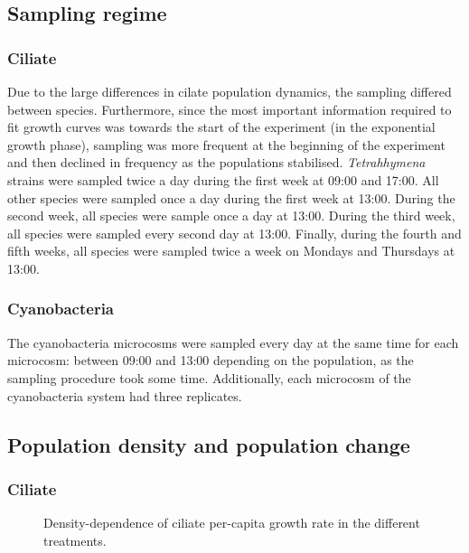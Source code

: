 \documentclass[
  letterpaper,
  DIV=11,
  numbers=noendperiod]{scrartcl}
\begin{document}
\subsection{Sampling regime}\label{sec-sampling_times}

\subsubsection{Ciliate}\label{ciliate}

Due to the large differences in cilate population dynamics, the sampling
differed between species. Furthermore, since the most important
information required to fit growth curves was towards the start of the
experiment (in the exponential growth phase), sampling was more frequent
at the beginning of the experiment and then declined in frequency as the
populations stabilised. \emph{Tetrahhymena} strains were sampled twice a
day during the first week at 09:00 and 17:00. All other species were
sampled once a day during the first week at 13:00. During the second
week, all species were sample once a day at 13:00. During the third
week, all species were sampled every second day at 13:00. Finally,
during the fourth and fifth weeks, all species were sampled twice a week
on Mondays and Thursdays at 13:00.

\subsubsection{Cyanobacteria}\label{cyanobacteria}

The cyanobacteria microcosms were sampled every day at the same time for
each microcosm: between 09:00 and 13:00 depending on the population, as
the sampling procedure took some time. Additionally, each microcosm of
the cyanobacteria system had three replicates.

\subsection{Population density and population
change}\label{population-density-and-population-change}

\subsubsection{Ciliate}\label{ciliate-1}

\begin{figure}


\caption{\label{fig-cilia-pcgr}Density-dependence of ciliate per-capita
growth rate in the different treatments.}

\end{figure}%
\end{document}
